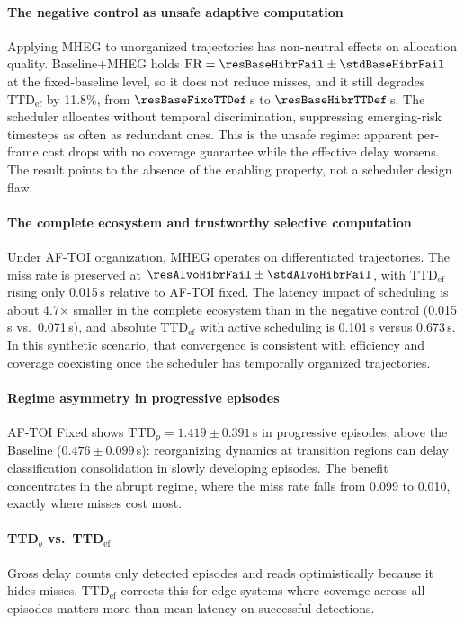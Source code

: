 \documentclass[a4paper,fleqn]{cas-dc}
\newcommand{\AFTOI}{\mbox{AF-TOI}\xspace}
\newcommand{\MHEG}{\mbox{MHEG}\xspace}
\begin{document}
\paragraph{The negative control as unsafe adaptive computation}
Applying \MHEG to unorganized trajectories has non-neutral effects on allocation
quality. Baseline+MHEG holds $\text{FR} = \resBaseHibrFail \pm \stdBaseHibrFail$
at the fixed-baseline level, so it does not reduce misses, and it still degrades
$\mathrm{TTD}_{\mathrm{ef}}$ by 11.8\%, from $\resBaseFixoTTDef$\,s to
$\resBaseHibrTTDef$\,s. The scheduler allocates without temporal discrimination,
suppressing emerging-risk timesteps as often as redundant ones. This is the
unsafe regime: apparent per-frame cost drops with no coverage guarantee while
the effective delay worsens. The result points to the absence of the enabling
property, not a scheduler design flaw.
\paragraph{The complete ecosystem and trustworthy selective computation}
Under \AFTOI organization, \MHEG operates on differentiated trajectories. The
miss rate is preserved at $\resAlvoHibrFail \pm \stdAlvoHibrFail$, with
$\mathrm{TTD}_{\mathrm{ef}}$ rising only 0.015\,s relative to \AFTOI fixed. The
latency impact of scheduling is about 4.7$\times$ smaller in the complete
ecosystem than in the negative control (0.015\,s vs.\ 0.071\,s), and absolute
$\mathrm{TTD}_{\mathrm{ef}}$ with active scheduling is 0.101\,s versus 0.673\,s.
In this synthetic scenario, that convergence is consistent with efficiency and
coverage coexisting once the scheduler has temporally organized trajectories.
\paragraph{Regime asymmetry in progressive episodes}
\AFTOI Fixed shows $\text{TTD}_p = 1.419 \pm 0.391$\,s in progressive episodes,
above the Baseline ($0.476 \pm 0.099$\,s): reorganizing dynamics at transition
regions can delay classification consolidation in slowly developing episodes.
The benefit concentrates in the abrupt regime, where the miss rate falls from
0.099 to 0.010, exactly where misses cost most.
\paragraph{TTD$_b$ vs.\ TTD$_{\mathrm{ef}}$}
Gross delay counts only detected episodes and reads optimistically because it
hides misses. $\mathrm{TTD}_{\mathrm{ef}}$ corrects this for edge systems where
coverage across all episodes matters more than mean latency on successful
detections.
\end{document}
